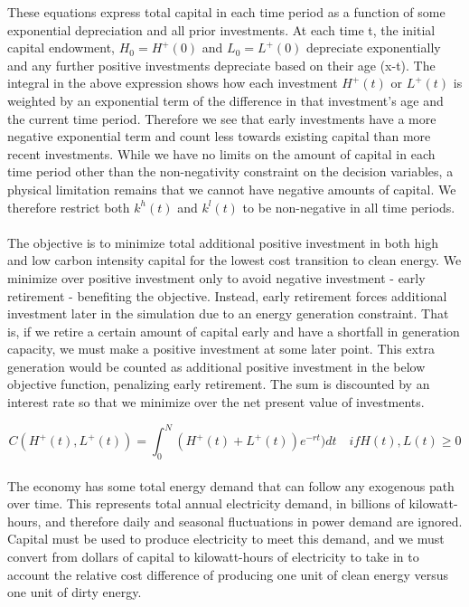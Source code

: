 \documentclass{easychithesis}
\begin{document}
These equations express total capital in each time period as a function of some exponential depreciation and all prior investments. At each time t, the initial capital endowment, $H_0 = H^+(0)$ and $L_0 = L^+(0)$ depreciate exponentially and any further positive investments depreciate based on their age (x-t). The integral in the above expression shows how each investment $H^+(t)$ or $L^+(t)$ is weighted by an exponential term of the difference in that investment's age and the current time period. Therefore we see that early investments have a more negative exponential term and count less towards existing capital than more recent investments. While we have no limits on the amount of capital in each time period other than the non-negativity constraint on the decision variables, a physical limitation remains that we cannot have negative amounts of capital. We therefore restrict both $k^h(t)$ and $k^l(t)$ to be non-negative in all time periods. 


\paragraph{} The objective is to minimize total additional positive investment in both high and low carbon intensity capital for the lowest cost transition to clean energy. We minimize over positive investment only to avoid negative investment - early retirement - benefiting the objective. Instead, early retirement forces additional investment later in the simulation due to an energy generation constraint. That is, if we retire a certain amount of capital early and have a shortfall in generation capacity, we must make a positive investment at some later point. This extra generation would be counted as additional positive investment in the below objective function, penalizing early retirement. The sum is discounted by an interest rate so that we minimize over the net present value of investments. 

\begin{equation}\label{eq:simpleObjective}
C(H^+(t), L^+(t)) = \int_0^N (H^+(t) + L^+(t))e^{-rt}) dt \quad if H(t), L(t) \geq 0
\end{equation}





\paragraph{} The economy has some total energy demand that can follow any exogenous path over time. This represents total annual electricity demand, in billions of kilowatt-hours, and therefore daily and seasonal fluctuations in power demand are ignored. Capital must be used to produce electricity to meet this demand, and we must convert from dollars of capital to kilowatt-hours of electricity to take in to account the relative cost difference of producing one unit of clean energy versus one unit of dirty energy. 
\end{document}
